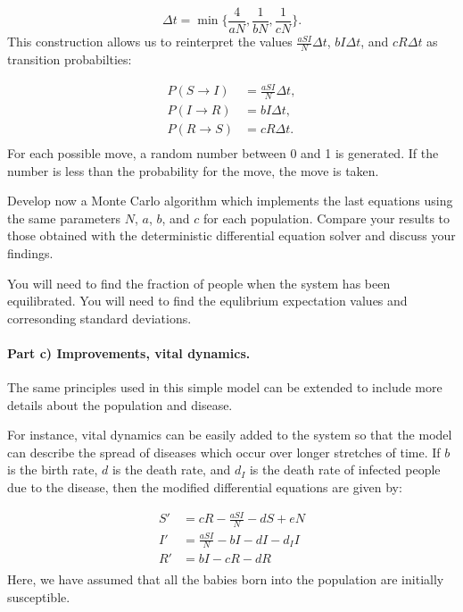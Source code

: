 \documentclass[%
oneside,                 %
final,                   %
10pt]{article}
\begin{document}
\begin{equation}
\Delta t = \min \Big\{ \frac{4}{aN}, \frac{1}{bN}, \frac{1}{cN} \Big\}.
\end{equation}
This construction allows us to reinterpret the values $\frac{aSI}{N}\Delta t$, $bI\Delta t$, and $cR\Delta t$ as transition probabilties:

\begin{equation}
\begin{split}
P(S\rightarrow I) &= \frac{aSI}{N}\Delta t,\\
P(I \rightarrow R) &= bI\Delta t,\\
P(R \rightarrow S) &= cR\Delta t.\\
\end{split}
\end{equation}
For each possible move, a random number between 0 and 1 is generated. If the number is less than the probability for the move, the move is taken.

Develop now a Monte Carlo algorithm which implements the last
equations using the same parameters $N$, $a$, $b$, and $c$ for each
population. Compare your results to those obtained with the
deterministic differential equation solver and discuss your findings. 

You will need to find the
fraction of people when the system has been equilibrated.  You will
need to find the equlibrium expectation values and corresonding
standard deviations.

\paragraph{Part c) Improvements, vital dynamics.}
The same principles used in this simple model can be extended to
include more details about the population and disease.  

For instance, vital dynamics can be easily added to the system so that
the model can describe the spread of diseases which occur over longer
stretches of time. If $b$ is the birth rate, $d$ is the death rate,
and $d_I$ is the death rate of infected people due to the disease,
then the modified differential equations are given by:

\begin{equation}
\begin{split}
S'&=cR-\frac{aSI}{N}-dS+eN\\
I'&=\frac{aSI}{N}-bI-dI-d_I I\\
R'&=bI-cR-dR\\
\end{split}
\end{equation}
Here, we have assumed that all the babies born into the population are initially susceptible. 
\end{document}
